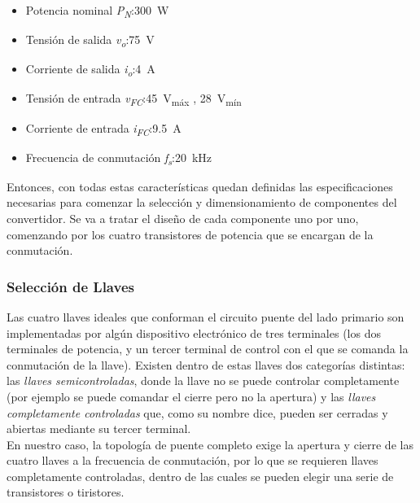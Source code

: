 \begin{itemize}
    \item {\SemiBold Potencia nominal \textit{P\textsubscript{N}}:}\quad\SI[]{300}[]{\watt}
    \item {\SemiBold Tensión de salida \textit{v\textsubscript{o}}:}\quad\SI[]{75}[]{\volt}
    \item {\SemiBold Corriente de salida \textit{i\textsubscript{o}}:}\quad\SI[]{4}[]{\ampere}
    \item {\SemiBold Tensión de entrada \textit{v\textsubscript{FC}}:}\quad\SI[]{45}[]{\volt}\textsubscript{máx} , \SI[]{28}[]{\volt}\textsubscript{mín}
    \item {\SemiBold Corriente de entrada \textit{i\textsubscript{FC}}:}\quad\SI[]{9.5}[]{\ampere}
    \item {\SemiBold Frecuencia de conmutación \textit{f\textsubscript{s}}:}\quad\SI[]{20}[]{\kilo\hertz}\\
\end{itemize}

Entonces, con todas estas características quedan definidas las especificaciones necesarias para comenzar la selección y dimensionamiento de componentes del convertidor. Se va a tratar el diseño de cada componente uno por uno, comenzando por los cuatro transistores de potencia que se encargan de la conmutación.\\

\subsubsection{Selección de Llaves}

Las cuatro llaves ideales que conforman el circuito puente del lado primario son implementadas por algún dispositivo electrónico de tres terminales (los dos terminales de potencia, y un tercer terminal de control con el que se comanda la conmutación de la llave). Existen dentro de estas llaves dos categorías distintas: las \textit{llaves semicontroladas}, donde la llave no se puede controlar completamente (por ejemplo se puede comandar el cierre pero no la apertura) y las \textit{llaves completamente controladas} que, como su nombre dice, pueden ser cerradas y abiertas mediante su tercer terminal.\\

En nuestro caso, la topología de puente completo exige la apertura y cierre de las cuatro llaves a la frecuencia de conmutación, por lo que se requieren {\Medium llaves completamente controladas}, dentro de las cuales se pueden elegir una serie de transistores o tiristores.\\

